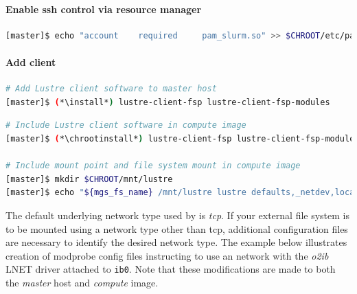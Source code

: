 \documentclass[letterpaper]{article}
\newcommand{\baseOS}{CentOS7.1}
\newcommand{\install}{yum -y install}
\newcommand{\chrootinstall}{yum -y --installroot=\$CHROOT install}
\begin{document}

\paragraph{Enable ssh control via resource manager} 



\begin{lstlisting}[language=bash,keywords={},upquote=true]
[master]$ echo "account    required     pam_slurm.so" >> $CHROOT/etc/pam.d/sshd
\end{lstlisting}

\paragraph{Add \Lustre{} client} \label{sec:lustre_client}



\begin{lstlisting}[language=bash,keywords={},upquote=true]
# Add Lustre client software to master host
[master]$ (*\install*) lustre-client-fsp lustre-client-fsp-modules
\end{lstlisting}

\begin{lstlisting}[language=bash,keywords={},upquote=true]
# Include Lustre client software in compute image
[master]$ (*\chrootinstall*) lustre-client-fsp lustre-client-fsp-modules

# Include mount point and file system mount in compute image
[master]$ mkdir $CHROOT/mnt/lustre
[master]$ echo "${mgs_fs_name} /mnt/lustre lustre defaults,_netdev,localflock 0 0" >> $CHROOT/etc/fstab
\end{lstlisting}

The default underlying network type used by \Lustre{} is {\em tcp}. If your
external \Lustre{} file system is to be mounted using a network type other than
tcp, additional configuration files are necessary to identify the desired
network type. The example below illustrates creation of modprobe config files
instructing \Lustre{} to use an \InfiniBand{} network with the {\em o2ib} LNET driver
attached to \texttt{ib0}. Note that these modifications are made to both the
{\em master} host and {\em compute} image.
\end{document}
